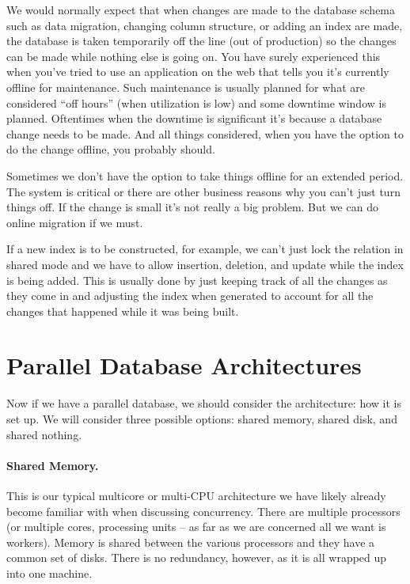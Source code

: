 \documentclass[a4paper]{report}
\begin{document}
We would normally expect that when changes are made to the database schema such as data migration, changing column structure, or adding an index are made, the database is taken temporarily off the line (out of production) so the changes can be made while nothing else is going on. You have surely experienced this when you've tried to use an application on the web that tells you it's currently offline for maintenance. Such maintenance is usually planned for what are considered ``off hours'' (when utilization is low) and some downtime window is planned. Oftentimes when the downtime is significant it's because a database change needs to be made. And all things considered, when you have the option to do the change offline, you probably should.

Sometimes we don't have the option to take things offline for an extended period. The system is critical or there are other business reasons why you can't just turn things off. If the change is small it's not really a big problem. But we can do online migration if we must. 

If a new index is to be constructed, for example, we can't just lock the relation in shared mode and we have to allow insertion, deletion, and update while the index is being added. This is usually done by just keeping track of all the changes as they come in and adjusting the index when generated to account for all the changes that happened while it was being built.

\section*{Parallel Database Architectures}

Now if we have a parallel database, we should consider the architecture: how it is set up. We will consider three possible options: shared memory, shared disk, and shared nothing.

\paragraph{Shared Memory.} This is our typical multicore or multi-CPU architecture we have likely already become familiar with when discussing concurrency. There are multiple processors (or multiple cores, processing units -- as far as we are concerned all we want is workers). Memory is shared between the various processors and they have a common set of disks. There is no redundancy, however, as it is all wrapped up into one machine.
\end{document}
